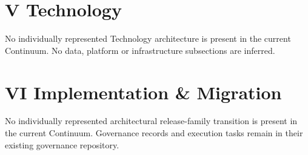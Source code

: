 \documentclass[10pt,a4paper]{article}
\begin{document}
\section*{V Technology}
No individually represented Technology architecture is present in the current Continuum. No data, platform or infrastructure subsections are inferred.\par
\section*{VI Implementation \& Migration}
No individually represented architectural release-family transition is present in the current Continuum. Governance records and execution tasks remain in their existing governance repository.\par
\end{document}
